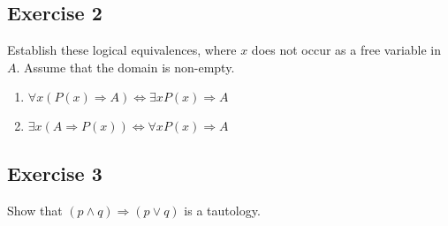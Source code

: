 \documentclass{article}
\begin{document}
\subsection*{Exercise 2}
Establish these logical equivalences, where $x$ does not occur as a free variable in $A$. Assume that the domain is non-empty.
\begin{enumerate}
	\item $\forall x(P(x) \Rightarrow A) \Leftrightarrow \exists xP(x) \Rightarrow A$
	\item $\exists x(A \Rightarrow P(x)) \Leftrightarrow \forall xP(x) \Rightarrow A$
\end{enumerate}
\subsection*{Exercise 3}
Show that $(p \wedge q) \Rightarrow (p \vee q)$ is a tautology.
\end{document}
